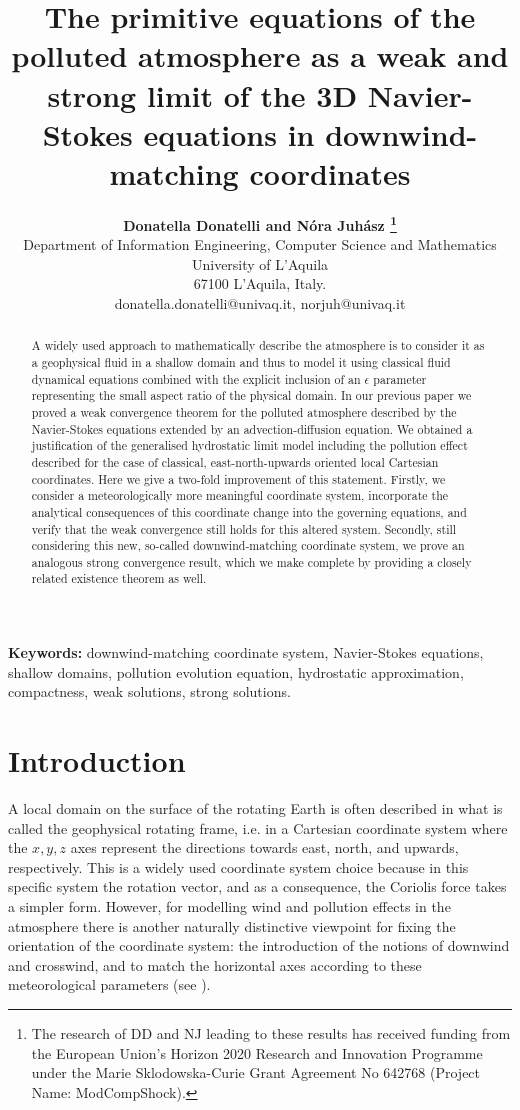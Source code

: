 \documentclass[11pt, a4paper]{article}
\title{The primitive equations of the polluted atmosphere as a weak and strong limit of the 3D Navier-Stokes equations in downwind-matching coordinates}
\author{
\large{\bf{Donatella Donatelli} and \bf{N\'ora Juh\'asz}
\thanks{The research of DD and NJ leading to these results has received funding from the European Union's Horizon 2020 Research and Innovation Programme under the Marie Sklodowska-Curie Grant Agreement No 642768 (Project Name: ModCompShock).}} \\[1ex]
\normalsize Department of Information Engineering, Computer Science and Mathematics \\
\normalsize University of L'Aquila \\
\normalsize 67100 L'Aquila, Italy. \\
\normalsize {donatella.donatelli@univaq.it}, {norjuh@univaq.it}
}
\date{}
\begin{document}
\maketitle

\begin{abstract}

A widely used approach to mathematically describe the atmosphere is to consider it as a geophysical fluid in a shallow domain and thus to model it using classical fluid dynamical equations combined with the explicit inclusion of an $\epsilon$ parameter representing the small aspect ratio of the physical domain. In our previous paper \cite{pollatmws2019} we proved a weak convergence theorem for the polluted atmosphere described by the Navier-Stokes equations extended by an advection-diffusion equation. We obtained a justification of the generalised hydrostatic limit model including the pollution effect described for the case of classical, east-north-upwards oriented local Cartesian coordinates. Here we give a two-fold improvement of this statement. Firstly, we consider a meteorologically more meaningful coordinate system, incorporate the analytical consequences of this coordinate change into the governing equations, and verify that the weak convergence still holds for this altered system. Secondly, still considering this new, so-called downwind-matching coordinate system, we prove an analogous strong convergence result, which we make complete by providing a closely related existence theorem as well.

\end{abstract}

{\bf Keywords:} downwind-matching coordinate system, Navier-Stokes equations, shallow domains, pollution evolution equation, hydrostatic approximation, compactness, weak solutions, strong solutions.

\newpage

\tableofcontents
\newpage

\section{Introduction} \label{Introduction}

A local domain on the surface of the rotating Earth is often described in what is called the geophysical rotating frame, i.e. in a Cartesian coordinate system where the $x, y, z$ axes represent the directions towards east, north, and upwards, respectively. This is a widely used coordinate system choice because in this specific system the rotation vector, and as a consequence, the Coriolis force takes a simpler form. However, for modelling wind and pollution effects in the atmosphere there is another naturally distinctive viewpoint for fixing the orientation of the coordinate system: the introduction of the notions of downwind and crosswind, and to match the horizontal axes according to these meteorological parameters (see \cite{goyal2011mathematical}).
\end{document}
